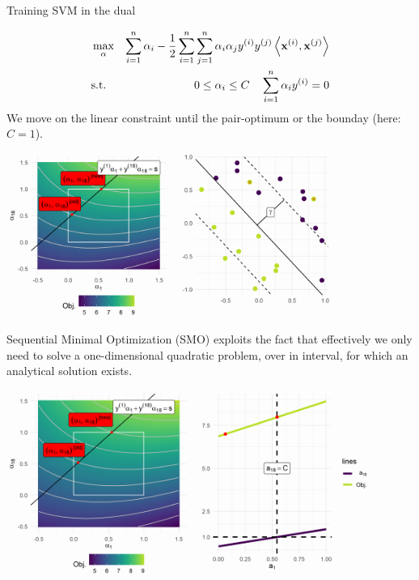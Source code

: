 \documentclass[11pt,compress,t,notes=noshow, xcolor=table]{beamer}
\begin{document}
\begin{vbframe}{Training SVM in the dual}
\vspace{-0.5cm}
\begin{footnotesize}  
\begin{eqnarray*}
    & \max_{\alpha} & \sum_{i=1}^n \alpha_i - \frac{1}{2}\sum_{i=1}^n\sum_{j=1}^n\alpha_i\alpha_jy^{(i)} y^{(j)} \left\langle \mathbf{x}^{(i)}, \mathbf{x}^{(j)} \right\rangle  \\
    & \text{s.t. } & 0 \le \alpha_i \le C \quad \sum_{i=1}^n \alpha_i y^{(i)} = 0
\end{eqnarray*}
We move on the linear constraint until the pair-optimum or the bounday (here: $C=1$).
\end{footnotesize}  

\vspace{0.1cm}

\begin{center}
\includegraphics[width = 0.8\textwidth]{figure/svm_training_02.png} \\
\end{center}

    
\framebreak    
Sequential Minimal Optimization (SMO) exploits the fact that effectively 
we only need to solve a one-dimensional quadratic problem, over in interval, 
for which an analytical solution exists.
    
\vspace{0.2cm}    
\begin{center}
\includegraphics[width = 0.9\textwidth]{figure/svm_training_03.png} \\
\end{center}


\end{vbframe}



\endlecture
\end{document}
